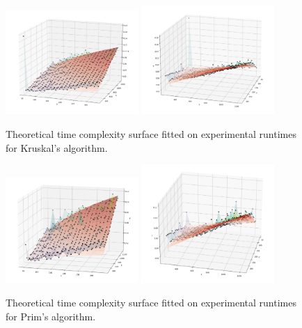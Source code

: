 \documentclass[12pt, a4paper]{article}
\begin{document}
\begin{figure}[!h]
\centering
\includegraphics[width=0.45\textwidth]{kruskal_1.png}
\includegraphics[width=0.45\textwidth]{kruskal_2.png}
\caption{Theoretical time complexity surface fitted on experimental runtimes for Kruskal's algorithm.}
\end{figure}

\begin{figure}[!h]
\centering
\includegraphics[width=0.45\textwidth]{prim_1.png}
\includegraphics[width=0.45\textwidth]{prim_2.png}
\caption{Theoretical time complexity surface fitted on experimental runtimes for Prim's algorithm.}
\end{figure}
\end{document}
